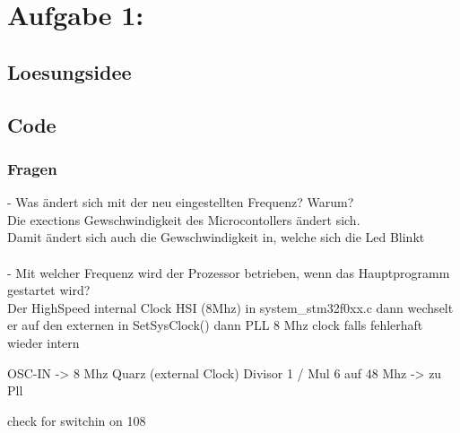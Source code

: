 \documentclass{report}
\newcommand{\name}{Marco Söllinger}
\newcommand{\matnr}{s2410306011}
\begin{document}


\section{Aufgabe 1:}

\subsection{Loesungsidee}


\subsection{Code}




\subsubsection{Fragen}
- Was ändert sich mit der neu eingestellten Frequenz? Warum?\\
Die exections Gewschwindigkeit des Microcontollers ändert sich.\\
Damit ändert sich auch die Gewschwindigkeit in, welche sich die Led Blinkt \\\\
-  Mit welcher Frequenz wird der Prozessor betrieben, wenn das Hauptprogramm gestartet wird? \\
Der HighSpeed internal Clock HSI (8Mhz) in system_stm32f0xx.c dann wechselt er auf den externen in SetSysClock()
dann PLL 8 Mhz clock falls fehlerhaft wieder intern 

OSC-IN -> 8 Mhz Quarz (external Clock) Divisor 1 / Mul 6 auf 48 Mhz -> zu Pll

check for switchin on 108
\end{document}
